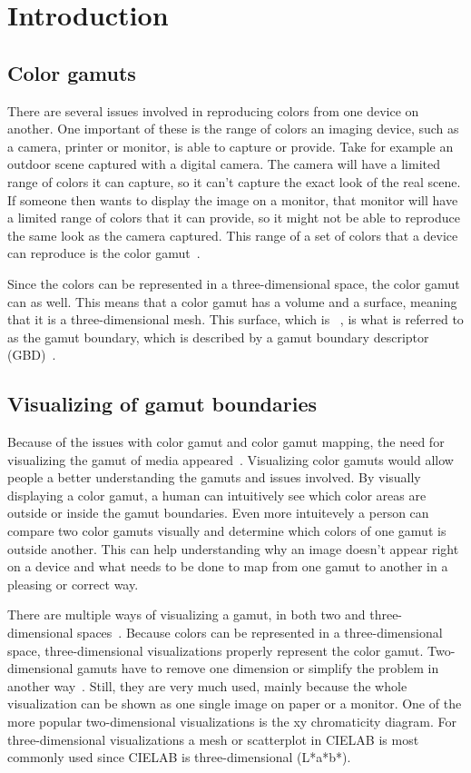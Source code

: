 \section{Introduction}

\subsection{Color gamuts}
There are several issues involved in reproducing colors from one device on another.
One important of these is the range of colors an imaging device, such as a camera, printer or monitor, is able to capture or provide.
Take for example an outdoor scene captured with a digital camera.
The camera will have a limited range of colors it can capture, so it can't capture the exact look of the real scene.
If someone then wants to display the image on a monitor, that monitor will have a limited range of colors that it can provide, so it might not be able to reproduce the same look as the camera captured.
This range of a set of colors that a device can reproduce is the color gamut~\cite{GamutMapping,HandbookGamutMapping}.

Since the colors can be represented in a three-dimensional space, the color gamut can as well.
This means that a color gamut has a volume and a surface, meaning that it is a three-dimensional mesh.
This surface, which is ~\cite{ColourImageScience}, is what is referred to as the gamut boundary, which is described by a gamut boundary descriptor (GBD)~\cite{HandbookGamutMapping}.

\subsection{Visualizing of gamut boundaries}
Because of the issues with color gamut and color gamut mapping, the need for visualizing the gamut of media appeared~\cite{InteractiveGamutMapping}.
Visualizing color gamuts would allow people a better understanding the gamuts and issues involved.
By visually displaying a color gamut, a human can intuitively see which color areas are outside or inside the gamut boundaries.
Even more intuitevely a person can compare two color gamuts visually and determine which colors of one gamut is outside another.
This can help understanding why an image doesn't appear right on a device and what needs to be done to map from one gamut to another in a pleasing or correct way.

There are multiple ways of visualizing a gamut, in both two and three-dimensional spaces~\cite{ColourImaging,InteractiveGamutMapping}.
Because colors can be represented in a three-dimensional space, three-dimensional visualizations properly represent the color gamut.
Two-dimensional gamuts have to remove one dimension or simplify the problem in another way~\cite{InteractiveGamutMapping}.
Still, they are very much used, mainly because the whole visualization can be shown as one single image on paper or a monitor.
One of the more popular two-dimensional visualizations is the xy chromaticity diagram.
For three-dimensional visualizations a mesh or scatterplot in CIELAB is most commonly used since CIELAB is three-dimensional (L*a*b*).


